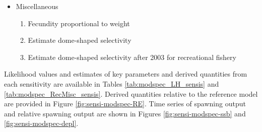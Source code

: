 \documentclass[11pt,
  english,
  a4paper,
]{article}
\begin{document}
\begin{itemize}
  \tagstructend
\item

  Miscellaneous

  \tagmcend\tagstructend\tagstructend


  \begin{enumerate}
  \def\labelenumi{\arabic{enumi}.}
  \setcounter{enumi}{16}
  \item


    Fecundity proportional to weight

    \tagmcend\tagstructend\tagstructend

    \tagmcend\tagstructend\tagstructend
  \item


    Estimate dome-shaped selectivity

    \tagmcend\tagstructend\tagstructend

    \tagmcend\tagstructend\tagstructend
  \item


    Estimate dome-shaped selectivity after 2003 for recreational fishery

    \tagmcend\tagstructend\tagstructend

    \tagmcend\tagstructend\tagstructend
  \end{enumerate}

  \tagstructend
\end{itemize}

\tagstructend


Likelihood values and estimates of key parameters and derived quantities from each sensitivity are available in Tables \ref{tab:modspec_LH_sensis} and \ref{tab:modspec_RecMisc_sensis}. Derived quantities relative to the reference model are provided in Figure \ref{fig:sensi-modspec-RE}. Time series of spawning output and relative spawning output are shown in Figures \ref{fig:sensi-modspec-ssb} and \ref{fig:sensi-modspec-depl}.
\end{document}
